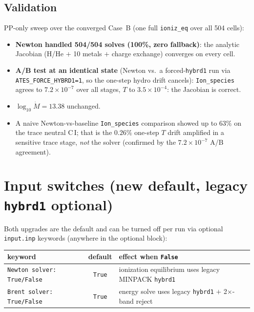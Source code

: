 \documentclass[english,a4paper]{my_memo}
\begin{document}
\subsection{Validation}
PP-only sweep over the converged Case~B (one full \texttt{ioniz\_eq} over all 504
cells):
\begin{itemize}
\item \textbf{Newton handled 504/504 solves (100\%, zero fallback)}: the
  analytic Jacobian (H/He $+$ 10 metals $+$ charge exchange) converges on every cell.
\item \textbf{A/B test at an identical state} (Newton vs.\ a forced-\texttt{hybrd1}
  run via \texttt{ATES\_FORCE\_HYBRD1=1}, so the one-step hydro drift cancels):
  \texttt{Ion\_species} agrees to \textbf{$7.2\times10^{-7}$} over all stages, $T$
  to $3.5\times10^{-4}$: the Jacobian is correct.
\item $\log_{10}\dot M = 13.38$ unchanged.
\item A naive Newton-vs-baseline \texttt{Ion\_species} comparison showed up to
  $63\%$ on the trace neutral C\,I; that is the $0.26\%$ one-step $T$ drift amplified
  in a sensitive trace stage, \emph{not} the solver (confirmed by the
  $7.2\times10^{-7}$ A/B agreement).
\end{itemize}

\section{Input switches (new default, legacy \texttt{hybrd1} optional)}\label{sec:switch}
Both upgrades are the default and can be turned off per run via optional
\texttt{input.inp} keywords (anywhere in the optional block):

\begin{center}\small
\begin{tabular}{@{}lcl@{}}
\toprule
keyword & default & effect when \texttt{False} \\
\midrule
\texttt{Newton solver: True/False} & \texttt{True} & ionization equilibrium uses legacy MINPACK \texttt{hybrd1} \\
\texttt{Brent solver: True/False}  & \texttt{True} & energy solve uses legacy \texttt{hybrd1} $+$ 2$\times$-band reject \\
\bottomrule
\end{tabular}
\end{center}
\end{document}
